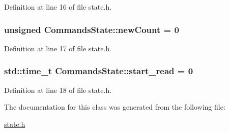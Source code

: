 Definition at line 16 of file state.\+h.

\subsubsection[{\texorpdfstring{new\+Count}{newCount}}]{\setlength{\rightskip}{0pt plus 5cm}unsigned Commands\+State\+::new\+Count = 0}\hypertarget{class_commands_state_a9d4a6edd6fc21c07150ec1bebf8516f4}{}\label{class_commands_state_a9d4a6edd6fc21c07150ec1bebf8516f4}


Definition at line 17 of file state.\+h.

\subsubsection[{\texorpdfstring{start\+\_\+read}{start_read}}]{\setlength{\rightskip}{0pt plus 5cm}std\+::time\+\_\+t Commands\+State\+::start\+\_\+read = 0}\hypertarget{class_commands_state_affdc3152f2776d90a04971104fea81af}{}\label{class_commands_state_affdc3152f2776d90a04971104fea81af}


Definition at line 18 of file state.\+h.



The documentation for this class was generated from the following file\+:\begin{DoxyCompactItemize}
\item 
\hyperlink{state_8h}{state.\+h}\end{DoxyCompactItemize}

